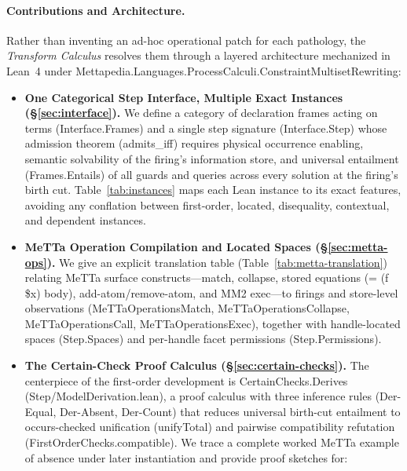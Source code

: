 \documentclass[11pt,a4paper]{article}
\theoremstyle{definition}
\DeclareRobustCommand{\lean}[1]{%
  \ifmmode\text{\normalfont\ttfamily\footnotesize\detokenize{#1}}%
  \else{\normalfont\footnotesize\leanurl{#1}}\fi}
\DeclareRobustCommand{\metta}[1]{\text{\normalfont\ttfamily\footnotesize #1}}
\DeclareRobustCommand{\RuleName}[1]{\text{\normalfont\scshape\small #1}}
\def\lean#1{#1}%
\def\metta#1{#1}%
\def\RuleName#1{#1}%
\begin{document}
\paragraph{Contributions and Architecture.}
Rather than inventing an ad-hoc operational patch for each pathology, the \emph{Transform Calculus} resolves them through a layered architecture mechanized in Lean~4 under \lean{Mettapedia.Languages.ProcessCalculi.ConstraintMultisetRewriting}:
\begin{itemize}[leftmargin=1.8em]
  \item \textbf{One Categorical Step Interface, Multiple Exact Instances (\S\ref{sec:interface}).}
  We define a category of declaration frames acting on terms (\lean{Interface.Frames}) and a single step signature (\lean{Interface.Step}) whose admission theorem (\lean{admits_iff}) requires physical occurrence enabling, semantic solvability of the firing's information store, and universal entailment (\lean{Frames.Entails}) of all guards and queries across every solution at the firing's birth cut. Table~\ref{tab:instances} maps each Lean instance to its exact features, avoiding any conflation between first-order, located, disequality, contextual, and dependent instances.
  \item \textbf{MeTTa Operation Compilation and Located Spaces (\S\ref{sec:metta-ops}).}
  We give an explicit translation table (Table~\ref{tab:metta-translation}) relating MeTTa surface constructs---\metta{match}, \metta{collapse}, stored equations \metta{(= (f \$x) body)}, \metta{add-atom}/\metta{remove-atom}, and MM2 \metta{exec}---to firings and store-level observations (\lean{MeTTaOperationsMatch}, \lean{MeTTaOperationsCollapse}, \lean{MeTTaOperationsCall}, \lean{MeTTaOperationsExec}), together with handle-located spaces (\lean{Step.Spaces}) and per-handle facet permissions (\lean{Step.Permissions}).
  \item \textbf{The Certain-Check Proof Calculus (\S\ref{sec:certain-checks}).}
  The centerpiece of the first-order development is \lean{CertainChecks.Derives} (\lean{Step/ModelDerivation.lean}), a proof calculus with three inference rules (\RuleName{Der-Equal}, \RuleName{Der-Absent}, \RuleName{Der-Count}) that reduces universal birth-cut entailment to occurs-checked unification (\lean{unifyTotal}) and pairwise compatibility refutation (\lean{FirstOrderChecks.compatible}). We trace a complete worked MeTTa example of absence under later instantiation and provide proof sketches for:
  \begin{enumerate}[label=(\roman*)]

\end{enumerate}
\end{itemize}
\end{document}
